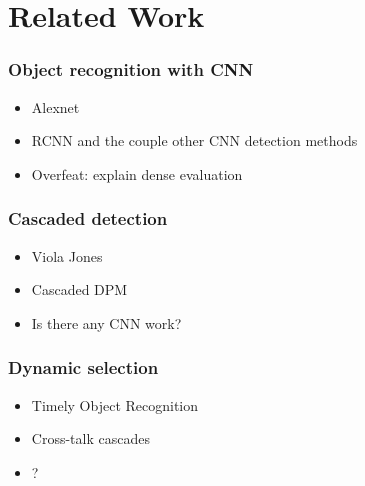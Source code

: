 \section{Related Work}\label{related-work}

\subsubsection{Object recognition with
CNN}\label{object-recognition-with-cnn}

\begin{itemize}
\itemsep1pt\parskip0pt
\item
  Alexnet
\item
  RCNN and the couple other CNN detection methods
\item
  Overfeat: explain dense evaluation
\end{itemize}

\subsubsection{Cascaded detection}\label{cascaded-detection}

\begin{itemize}
\itemsep1pt\parskip0pt
\item
  Viola Jones
\item
  Cascaded DPM
\item
  Is there any CNN work?
\end{itemize}

\subsubsection{Dynamic selection}\label{dynamic-selection}

\begin{itemize}
\itemsep1pt\parskip0pt
\item
  Timely Object Recognition
\item
  Cross-talk cascades
\item
  ?
\end{itemize}
